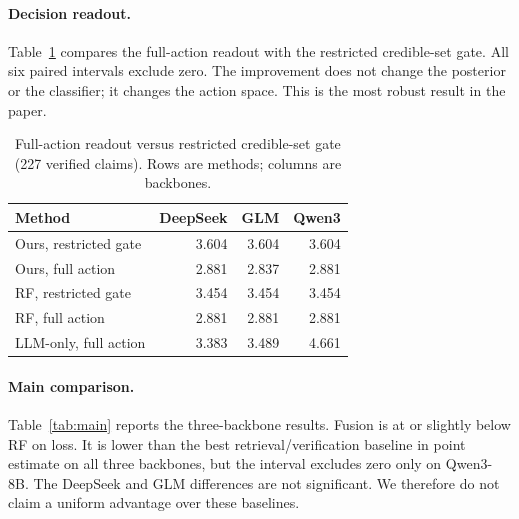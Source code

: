 \documentclass[11pt]{article}
\begin{document}
\paragraph{Decision readout.}
Table~\ref{tab:readout} compares the full-action readout with the restricted credible-set gate. All six paired intervals exclude zero. The improvement does not change the posterior or the classifier; it changes the action space. This is the most robust result in the paper.

\begin{table}[t]
\centering
\small
\caption{Full-action readout versus restricted credible-set gate (227 verified claims). Rows are methods; columns are backbones.}
\label{tab:readout}
\begin{tabular}{lrrr}
\toprule
Method & DeepSeek & GLM & Qwen3 \\
\midrule
Ours, restricted gate & 3.604 & 3.604 & 3.604 \\
Ours, full action & 2.881 & 2.837 & 2.881 \\
RF, restricted gate & 3.454 & 3.454 & 3.454 \\
RF, full action & 2.881 & 2.881 & 2.881 \\
LLM-only, full action & 3.383 & 3.489 & 4.661 \\
\bottomrule
\end{tabular}
\end{table}

\paragraph{Main comparison.}
Table~\ref{tab:main} reports the three-backbone results. Fusion is at or slightly below RF on loss. It is lower than the best retrieval/verification baseline in point estimate on all three backbones, but the interval excludes zero only on Qwen3-8B. The DeepSeek and GLM differences are not significant. We therefore do not claim a uniform advantage over these baselines.
\end{document}
